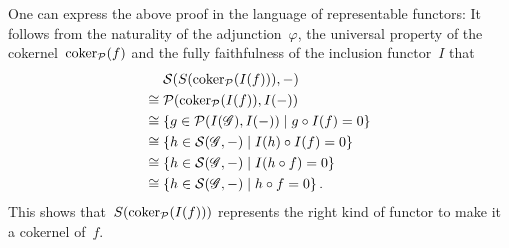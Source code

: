 \begin{example}
\begin{enumerate}
      \begin{remark*}
        One can express the above proof in the language of representable functors:
        It follows from the naturality of the adjunction~$\varphi$, the universal property of the cokernel~$\operatorname{coker}_{\mathcal{P}}(f)$ and the fully faithfulness of the inclusion functor~$I$ that
        \begin{align*}
               {}&  \Scat(S(\coker_{\Pcat}(I(f))), -) \\
          \cong{}&  \Pcat(\coker_{\Pcat}(I(f)), I(-)) \\
          \cong{}&  \{
                      g \in \Pcat(I(\sheaf{G}), I(-))
                    \suchthat
                      g \circ I(f) = 0
                    \}  \\
          \cong{}&  \{
                      h \in \Scat(\sheaf{G},-)
                    \suchthat
                      I(h) \circ I(f) = 0
                    \}  \\
          \cong{}&  \{
                      h \in \Scat(\sheaf{G},-)
                    \suchthat
                      I(h \circ f) = 0
                    \}  \\
          \cong{}&  \{
                      h \in \Scat(\sheaf{G},-)
                    \suchthat
                      h \circ f = 0
                    \} \,.
        \end{align*}
        This shows that~$S(\operatorname{coker}_{\mathcal{P}}(I(f)))$ represents the right kind of functor to make it a cokernel of~$f$.
      \end{remark*}
  \end{enumerate}
  
\end{example}








